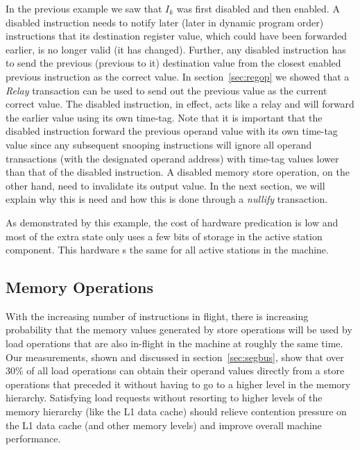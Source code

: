 \documentclass[10pt,twocolumn]{IEEEtran}
\begin{document}
In the previous example we saw that $I_k$ was f{ir}st disabled and
then enabled.  
A disabled instruction needs to notify later
(later in dynamic program order)
instructions that its destination register value, which could have
been forwarded earlier, is no longer valid (it has changed).  
Further, any disabled instruction has to
send the previous (previous to it) destination value from 
the closest enabled previous
instruction as the correct value.  
In section~\ref{sec:regop} we showed that 
a \emph{Relay}
transaction can be used to send out the previous value as the current
correct value.
The disabled instruction, in effect,
acts like a relay and will forward the earlier value using its own
time-tag.  
Note that it is important that the disabled instruction forward
the previous operand value with its own time-tag value since
any subsequent snooping instructions will ignore all operand
transactions (with the designated operand address) with time-tag
values lower than that of the disabled instruction.
A disabled memory store operation, on the other hand, 
need to invalidate its output value.  In the next section, we will explain
why this is need and how this is done through a \emph{nullify} transaction.

As demonstrated by this example, the cost of hardware predication
is low and most of the extra state only uses a few
bits of storage in the active station component.  
This hardware s the same for all active stations in the machine.
%
%
\subsection {Memory Operations}
%
With the increasing number of instructions in flight, there is 
increasing probability
that the memory values generated by store operations will
be used by load operations that are also in-flight in the machine
at roughly the same time.  
Our measurements, shown and discussed 
in section~\ref{sec:segbus},
show that over 30\% of all load operations can obtain their operand values
directly from a store operations that preceded it
without having
to go to a higher level in the memory hierarchy.  
Satisfying load requests without resorting to higher levels of the
memory hierarchy (like the L1 data cache) should relieve contention
pressure on the L1 data cache (and other memory levels) and
improve overall machine performance.
\end{document}
